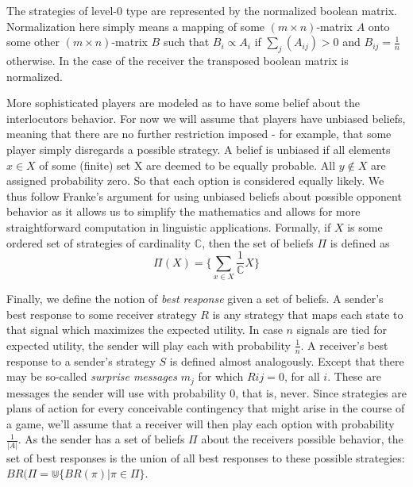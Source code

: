 \documentclass[10]{article}
\begin{document}
The strategies of level-0 type are represented by the normalized boolean matrix. Normalization here simply means a mapping of some $(m\times n)$-matrix $A$ onto some other $(m\times n)$-matrix $B$ such that $B_i\propto A_i$ if $\sum_j (A_{ij})>0$ and $B_{ij}=\tfrac{1}{n}$ otherwise. In the case of the receiver the transposed boolean matrix is normalized.

More sophisticated players are modeled as to have some belief about the interlocutors behavior. For now we will assume that players have unbiased beliefs, meaning that there are no further restriction imposed - for example, that some player simply disregards a possible strategy. A belief is unbiased if all elements $x\in X$ of some (finite) set X are deemed to be equally probable. All $y\not\in X$ are assigned probability zero. So that each option is considered equally likely. We thus follow Franke's argument for
 using unbiased beliefs about possible opponent behavior as it allows us to simplify the mathematics and allows for more straightforward computation in linguistic applications. Formally, if $X$ is some ordered set of strategies of cardinality $\mathbb{C}$, then the set of beliefs $\Pi$ is defined as\\
\begin{equation*}
\Pi(X)=\{\sum_{x\in X} \dfrac{1}{\mathbb{C}}X\}
\end{equation*} %


Finally, we define the notion of \textit{best response} given a set of beliefs. A sender's best response to some receiver strategy $R$ is any strategy that maps each state to that signal which maximizes the expected utility. In case $n$ signals are tied for expected utility, the sender will play each with probability $\tfrac{1}{n}$.
A receiver's best response to a sender's strategy $S$ is defined almost analogously. Except that there may be so-called \textit{surprise messages} $m_j$ for which $R{ij}=0$, for all $i$. These are messages the sender will use with probability 0, that is, never. Since strategies are plans of action for every conceivable contingency that might arise in the course of a game, we'll assume that a receiver will then play each option with probability $\tfrac{1}{|A|}$.
As the sender has a set of beliefs $\Pi$ about the receivers possible behavior, the set of best responses is the union of all best responses to these possible strategies: $BR(\Pi=\Cup\{BR(\pi)|\pi\in\Pi\}$.
\end{document}
